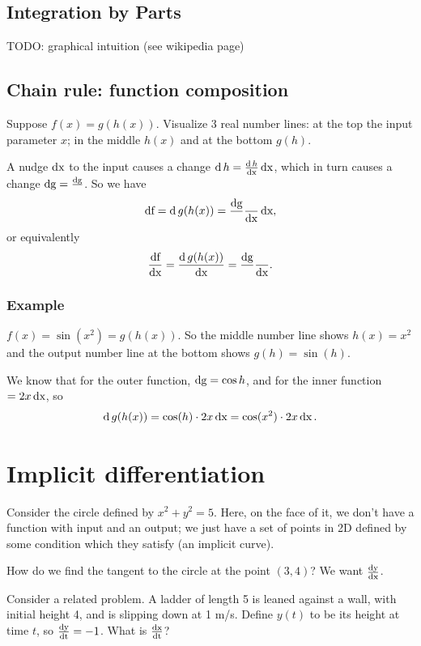 \documentclass[12pt]{article}
\DeclareMathOperator{\df}{\text{df}}
\DeclareMathOperator{\dg}{\text{dg}}
\let\dh\relax\DeclareMathOperator{\dh}{\text{dh}}
\begin{document}
\subsection{Integration by Parts}

TODO: graphical intuition (see wikipedia page)

\newpage
\subsection{Chain rule: function composition}
Suppose $f(x) = g(h(x))$. Visualize 3 real number lines: at the top the input
parameter $x$; in the middle $h(x)$ and at the bottom $g(h)$.

A nudge $\operatorname{\text{dx}}$ to the input causes a change $\operatorname{\text{d}} h = \frac{\operatorname{\text{d}} h}{\operatorname{\text{dx}}} \operatorname{\text{dx}}$, which in turn causes a
change $\dg = \frac{\dg}{\dh} \dh$. So we have
\begin{align*}
  \df = \d g(h(x)) = \frac{\dg}{\dh} \frac{\dh}{\dx} \dx,
\end{align*}
or equivalently
\begin{align*}
  \frac{\df}{\dx} = \frac{\d g(h(x))}{\dx} = \frac{\dg}{\dh} \frac{\dh}{\dx}.
\end{align*}

\subsubsection{Example}
$f(x) = \sin(x^2) = g(h(x))$. So the middle number line shows $h(x) = x^2$ and
the output number line at the bottom shows $g(h) = \sin(h)$.

We know that for the outer function, $\dg = \cos h \dh$, and for the inner
function $\dh = 2x \dx$, so
\begin{align*}
  \operatorname{\text{d}} g(h(x)) = \cos (h) \cdot 2x \operatorname{\text{dx}} = \cos(x^2)\cdot 2x \operatorname{\text{dx}}.
\end{align*}

\newpage
\section{Implicit differentiation}

Consider the circle defined by $x^2 + y^2 = 5$. Here, on the face of it, we
don't have a function with input and an output; we just have a set of points in
2D defined by some condition which they satisfy (an implicit curve).

How do we find the tangent to the circle at the point $(3,4)$? We want $\frac{\operatorname{\text{dy}}}{\operatorname{\text{dx}}}$.

Consider a related problem. A ladder of length 5 is leaned against a wall, with
initial height 4, and is slipping down at 1 m/s. Define $y(t)$ to be its height
at time $t$, so $\frac{\operatorname{\text{dy}}}{\operatorname{\text{dt}}} = -1$. What is $\frac{\operatorname{\text{dx}}}{\operatorname{\text{dt}}}$?
\end{document}
